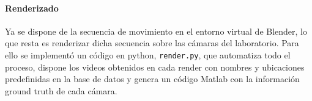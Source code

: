 \paragraph{Renderizado} 

Ya se dispone de la secuencia de movimiento en el entorno virtual de Blender, lo que resta es renderizar dicha secuencia sobre las cámaras del laboratorio. Para ello se implementó un código en python, \texttt{render.py},  que automatiza todo el proceso, dispone los videos obtenidos en cada render con nombres y ubicaciones predefinidas en la base de datos y genera un código Matlab con la información ground truth de cada cámara. 


 \begin{figure}[H]
   \centering 
    \hspace{1.0cm}

\end{figure}
